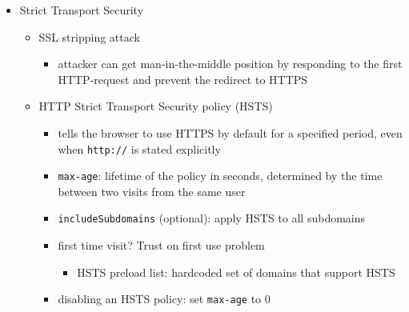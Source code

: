 \documentclass[12pt,titlepage,a4paper]{report}
\begin{document}
\begin{itemize}
				\item Strict Transport Security
				\begin{itemize}
					\item SSL stripping attack
					\begin{itemize}
						\item attacker can get man-in-the-middle position by responding to the first HTTP-request and prevent the redirect to HTTPS
					\end{itemize}
				
					\item HTTP Strict Transport Security policy (HSTS)
					\begin{itemize}
						\item tells the browser to use HTTPS by default for a specified period, even when \texttt{http://} is stated explicitly
						\item \texttt{max-age}: lifetime of the policy in seconds, determined by the time between two visits from the same user
						\item \texttt{includeSubdomains} (optional): apply HSTS to all subdomains
						\item first time visit? Trust on first use problem
						\begin{itemize}
							\item HSTS preload list: hardcoded set of domains that support HSTS
						\end{itemize}
						\item disabling an HSTS policy: set \texttt{max-age} to 0
					\end{itemize}
				\end{itemize}
			\end{itemize}
\end{document}
